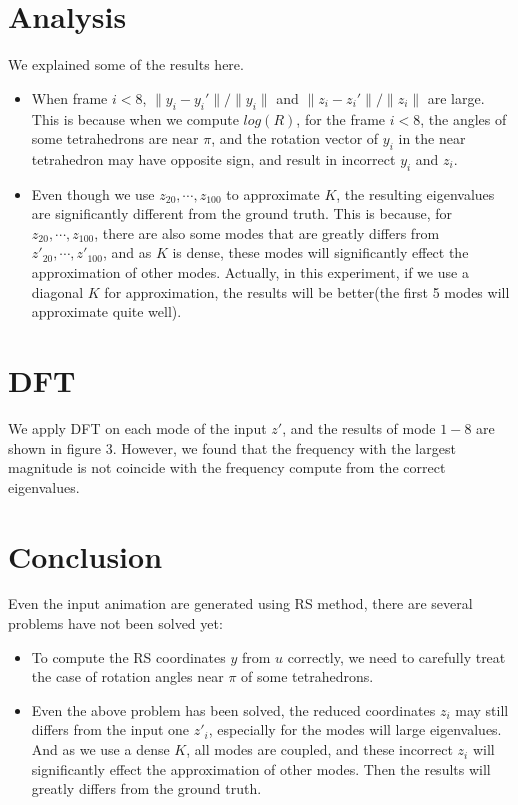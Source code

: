 \documentclass[twocolumn,a4paper]{article}
\begin{document}
\section{Analysis}
We explained some of the results here. 
\begin{itemize}
\item When frame $i<8$, $\|y_i-y_i'\|/\|y_i\|$ and $\|z_i-z_i'\|/\|z_i\|$ are
  large. This is because when we compute $log(R)$, for the frame $i<8$, the
  angles of some tetrahedrons are near $\pi$, and the rotation vector of $y_i$
  in the near tetrahedron may have opposite sign, and result in incorrect $y_i$
  and $z_i$.
\item Even though we use $z_{20},\cdots,z_{100}$ to approximate $K$, the
  resulting eigenvalues are significantly different from the ground truth. This
  is because, for $z_{20},\cdots,z_{100}$, there are also some modes that are
  greatly differs from $z'_{20},\cdots,z'_{100}$, and as $K$ is dense, these
  modes will significantly effect the approximation of other modes. Actually, in
  this experiment, if we use a diagonal $K$ for approximation, the results will
  be better(the first 5 modes will approximate quite well).
\end{itemize}

\section{DFT}
We apply DFT on each mode of the input $z'$, and the results of mode $1-8$ are
shown in figure 3. However, we found that the frequency with the largest
magnitude is not coincide with the frequency compute from the correct
eigenvalues.

\section{Conclusion}
Even the input animation are generated using RS method, there are several
problems have not been solved yet:
\begin{itemize}
\item To compute the RS coordinates $y$ from $u$ correctly, we need to carefully
  treat the case of rotation angles near $\pi$ of some tetrahedrons.
\item Even the above problem has been solved, the reduced coordinates $z_i$ may
  still differs from the input one $z'_i$, especially for the modes will large
  eigenvalues. And as we use a dense $K$, all modes are coupled, and these
  incorrect $z_i$ will significantly effect the approximation of other
  modes. Then the results will greatly differs from the ground truth.
\end{itemize}
\end{document}
